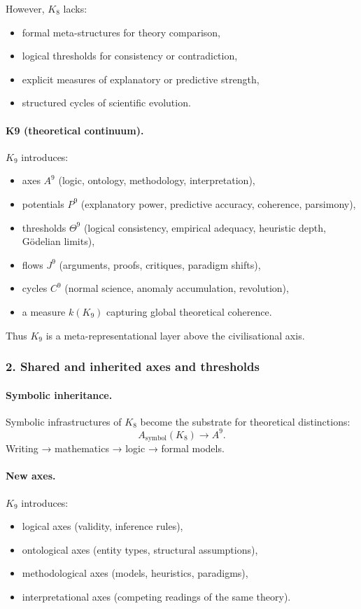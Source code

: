 However, $K_8$ lacks:
\begin{itemize}
  \item formal meta-structures for theory comparison,
  \item logical thresholds for consistency or contradiction,
  \item explicit measures of explanatory or predictive strength,
  \item structured cycles of scientific evolution.
\end{itemize}

\paragraph{K9 (theoretical continuum).}
$K_9$ introduces:
\begin{itemize}
  \item axes $A^9$ (logic, ontology, methodology, interpretation),
  \item potentials $P^9$ (explanatory power, predictive accuracy,
        coherence, parsimony),
  \item thresholds $\Theta^9$ (logical consistency, empirical adequacy,
        heuristic depth, Gödelian limits),
  \item flows $J^9$ (arguments, proofs, critiques, paradigm shifts),
  \item cycles $C^9$ (normal science, anomaly accumulation, revolution),
  \item a measure $k(K_9)$ capturing global theoretical coherence.
\end{itemize}

Thus $K_9$ is a meta-representational layer above the civilisational axis.

\subsubsection{2. Shared and inherited axes and thresholds}

\paragraph{Symbolic inheritance.}
Symbolic infrastructures of $K_8$ become the substrate for theoretical
distinctions:
\[
A_{\mathrm{symbol}}(K_8) \rightarrow A^9.
\]
Writing → mathematics → logic → formal models.

\paragraph{New axes.}
$K_9$ introduces:
\begin{itemize}
  \item logical axes (validity, inference rules),
  \item ontological axes (entity types, structural assumptions),
  \item methodological axes (models, heuristics, paradigms),
  \item interpretational axes (competing readings of the same theory).
\end{itemize}

